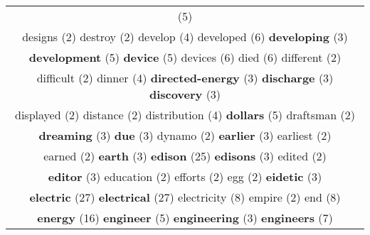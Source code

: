 \documentclass[12pt,a4paper]{article}
\begin{document}
\begin{center}
\begin{longtable}{|c|}
\footnotesize{(5)}  \\ {\footnotesize \textcolor{Verde} {designs}} \footnotesize{(2)} {\footnotesize \textcolor{Verde} {destroy}} \footnotesize{(2)} {\normalsize \textcolor{VerdeLocao} {develop}} \footnotesize{(4)} {\Large \textcolor{VermEscuro} {developed}} \footnotesize{(6)} {\small \textcolor{Laranja} {\bf developing}} \footnotesize{(3)}  \\ {\large \textcolor{Roxo} {\bf development}} \footnotesize{(5)} {\large \textcolor{Roxo} {\bf device}} \footnotesize{(5)} {\Large \textcolor{VermEscuro} {devices}} \footnotesize{(6)} {\Large \textcolor{VermEscuro} {died}} \footnotesize{(6)} {\footnotesize \textcolor{Verde} {different}} \footnotesize{(2)}  \\ {\footnotesize \textcolor{Verde} {difficult}} \footnotesize{(2)} {\normalsize \textcolor{VerdeLocao} {dinner}} \footnotesize{(4)} {\small \textcolor{Laranja} {\bf directed-energy}} \footnotesize{(3)} {\small \textcolor{Laranja} {\bf discharge}} \footnotesize{(3)} {\small \textcolor{Laranja} {\bf discovery}} \footnotesize{(3)}  \\ {\footnotesize \textcolor{Verde} {displayed}} \footnotesize{(2)} {\footnotesize \textcolor{Verde} {distance}} \footnotesize{(2)} {\normalsize \textcolor{VerdeLocao} {distribution}} \footnotesize{(4)} {\large \textcolor{Roxo} {\bf dollars}} \footnotesize{(5)} {\footnotesize \textcolor{Verde} {draftsman}} \footnotesize{(2)}  \\ {\small \textcolor{Laranja} {\bf dreaming}} \footnotesize{(3)} {\small \textcolor{Laranja} {\bf due}} \footnotesize{(3)} {\footnotesize \textcolor{Verde} {dynamo}} \footnotesize{(2)} {\small \textcolor{Laranja} {\bf earlier}} \footnotesize{(3)} {\footnotesize \textcolor{Verde} {earliest}} \footnotesize{(2)}  \\ {\footnotesize \textcolor{Verde} {earned}} \footnotesize{(2)} {\small \textcolor{Laranja} {\bf earth}} \footnotesize{(3)} {\Huge \textcolor{AzulEscuro} {\bf edison}} \footnotesize{(25)} {\small \textcolor{Laranja} {\bf edisons}} \footnotesize{(3)} {\footnotesize \textcolor{Verde} {edited}} \footnotesize{(2)}  \\ {\small \textcolor{Laranja} {\bf editor}} \footnotesize{(3)} {\footnotesize \textcolor{Verde} {education}} \footnotesize{(2)} {\footnotesize \textcolor{Verde} {efforts}} \footnotesize{(2)} {\footnotesize \textcolor{Verde} {egg}} \footnotesize{(2)} {\small \textcolor{Laranja} {\bf eidetic}} \footnotesize{(3)}  \\ {\Huge \textcolor{AzulEscuro} {\bf electric}} \footnotesize{(27)} {\Huge \textcolor{AzulEscuro} {\bf electrical}} \footnotesize{(27)} {\huge \textcolor{Amarelo} {electricity}} \footnotesize{(8)} {\footnotesize \textcolor{Verde} {empire}} \footnotesize{(2)} {\huge \textcolor{Amarelo} {end}} \footnotesize{(8)}  \\ {\Huge \textcolor{AzulEscuro} {\bf energy}} \footnotesize{(16)} {\large \textcolor{Roxo} {\bf engineer}} \footnotesize{(5)} {\small \textcolor{Laranja} {\bf engineering}} \footnotesize{(3)} {\LARGE \textcolor{Rosa} {\bf engineers}} \footnotesize{(7)} {\footnotesize \textcolor{Verde} 
\end{longtable}
\end{center}
\end{document}
